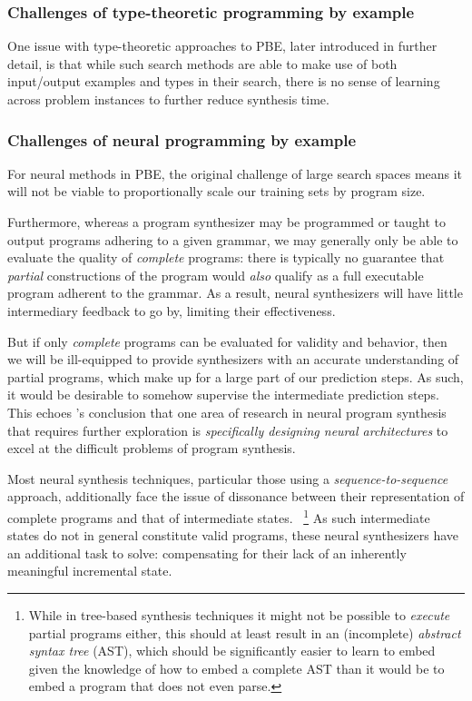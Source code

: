 \documentclass{article}
\begin{document}
\subsubsection{Challenges of type-theoretic programming by example} \label{sec:typepbe}

One issue with type-theoretic approaches to PBE, later introduced in further detail,
is that while such search methods are able to make use of both input/output examples and types in their search,
there is no sense of learning across problem instances to further reduce synthesis time.

\subsubsection{Challenges of neural programming by example} %

For neural methods in PBE, the original challenge of large search spaces means
it will not be viable to proportionally scale our training sets by program size.

Furthermore, whereas a program synthesizer may be programmed or taught to output programs adhering to a given grammar,
we may generally only be able to evaluate the quality of \emph{complete} programs:
there is typically no guarantee that \emph{partial} constructions of the program would \emph{also} qualify as a full executable program adherent to the grammar.
As a result, neural synthesizers will have little intermediary feedback to go by, limiting their effectiveness.

But if only \emph{complete} programs can be evaluated for validity and behavior, then 
we will be ill-equipped to provide synthesizers with an accurate understanding of partial programs,
which make up for a large part of our prediction steps.
As such, it would be desirable to somehow supervise the intermediate prediction steps.
This echoes \citet{nps}'s conclusion that one area of research in neural program synthesis that requires further exploration is
\emph{specifically designing neural architectures} to excel at the difficult problems of program synthesis.


Most neural synthesis techniques, particular those using a \emph{sequence-to-sequence} approach,
additionally face the issue of dissonance between their representation of complete programs and that of intermediate states.%
~\footnote{
    While in tree-based synthesis techniques it might not be possible to \emph{execute} partial programs either,
    this should at least result in an (incomplete) \emph{abstract syntax tree} (AST),
    which should be significantly easier to learn to embed given the knowledge of how to embed a complete AST than it would be to embed a program that does not even parse.
}
As such intermediate states do not in general constitute valid programs,
these neural synthesizers have an additional task to solve:
compensating for their lack of an inherently meaningful incremental state.
\end{document}
